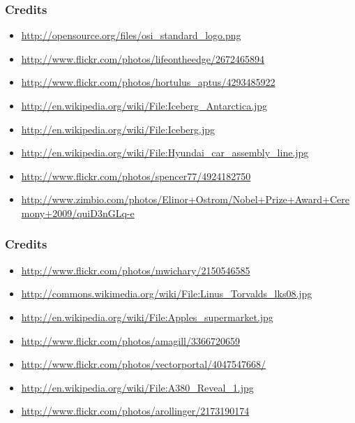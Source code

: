 \documentclass[18pt]{beamer}
\begin{document}
\begin{frame}
\frametitle{Credits}
\begin{itemize}
\item \url{http://opensource.org/files/osi_standard_logo.png}
\item \url{http://www.flickr.com/photos/lifeontheedge/2672465894}
\item \url{http://www.flickr.com/photos/hortulus_aptus/4293485922}
\item \url{http://en.wikipedia.org/wiki/File:Iceberg_Antarctica.jpg}
\item \url{http://en.wikipedia.org/wiki/File:Iceberg.jpg}
\item \url{http://en.wikipedia.org/wiki/File:Hyundai_car_assembly_line.jpg}
\item \url{http://www.flickr.com/photos/spencer77/4924182750}
\item \url{http://www.zimbio.com/photos/Elinor+Ostrom/Nobel+Prize+Award+Ceremony+2009/quiD3nGLq-e}
\end{itemize}
\end{frame}


\begin{frame}
\frametitle{Credits}
\begin{itemize}
\item \url{http://www.flickr.com/photos/mwichary/2150546585}
\item \url{http://commons.wikimedia.org/wiki/File:Linus_Torvalds_lks08.jpg}
\item \url{http://en.wikipedia.org/wiki/File:Apples_supermarket.jpg}
\item \url{http://www.flickr.com/photos/amagill/3366720659}
\item \url{http://www.flickr.com/photos/vectorportal/4047547668/}
\item \url{http://en.wikipedia.org/wiki/File:A380_Reveal_1.jpg}
\item \url{http://www.flickr.com/photos/arollinger/2173190174}
\end{itemize}
\end{frame}
\end{document}
